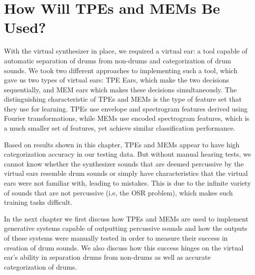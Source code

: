 \documentclass[\main/thesis.tex]{subfiles}
\begin{document}

\section{How Will TPEs and MEMs Be Used?}

With the virtual synthesizer in place, we required a virtual ear: a tool capable of automatic separation of drums from non-drums and categorization of drum sounds.  We took two different approaches to implementing such a tool, which gave us two types of virtual ears: TPE Ears, which make the two decisions sequentially, and MEM ears which makes these decisions simultaneously. The distinguishing characteristic of TPEs and MEMs is the type of feature set that they use for learning. TPEs use envelope and spectrogram features derived using Fourier transformations, while MEMs use encoded spectrogram features, which is a much smaller set of features, yet achieve similar classification performance.  

 Based on results shown in this chapter, TPEs and MEMs appear to have high categorization accuracy in our testing data. But without manual hearing tests, we cannot know whether the synthesizer sounds that are deemed percussive by the virtual ears resemble drum sounds or simply have characteristics that the virtual ears were not familiar with, leading to mistakes. This is due to the infinite variety of sounds that are not percussive (i.e, the OSR problem), which makes such training tasks difficult. 
 
In the next chapter we first discuss how TPEs and MEMs are used to implement generative systems capable of outputting percussive sounds and how the outputs of these systems were manually tested in order to measure their success in creation of drum sounds. We also discuss how this success hinges on the virtual ear's ability in separation drums from non-drums as well as accurate categorization of drums. 

 
\end{document}
